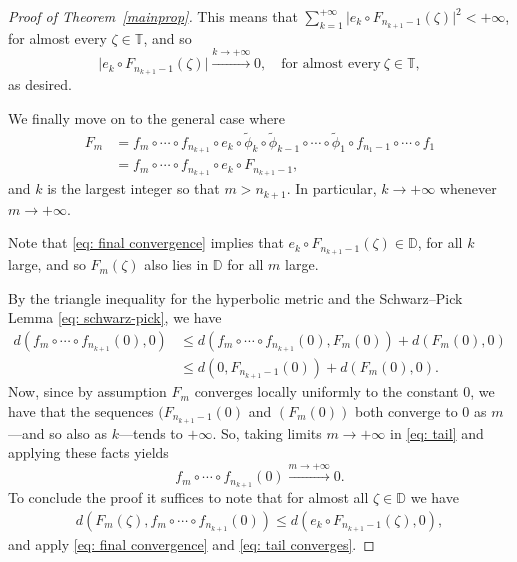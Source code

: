 \documentclass[11pt, reqno]{amsart}
\theoremstyle{definition}
\numberwithin{equation}{section}
\newcommand{\D}{\mathbb{D}}
\newcommand{\T}{\mathbb{T}}
\renewcommand{\leq}{\leqslant}
\begin{document}
\begin{proof}[Proof of Theorem~\ref{mainprop}]
This means that $\sum\limits_{k=1}^{+\infty} \lvert e_k\circ F_{n_{k+1}-1}(\zeta)\rvert^2<+\infty$, for almost every $\zeta\in\T$, and so 
\begin{equation}\label{eq: final convergence}
\lvert e_k\circ F_{n_{k+1}-1}(\zeta) \rvert\xrightarrow{k\to+\infty} 0, \quad \text{for almost every}\  \zeta\in\T,
\end{equation} 
as desired.

We finally move on to the general case where
\begin{align*}
F_m&= f_m\circ\cdots \circ f_{n_{k+1}}\circ e_k\circ \widetilde{\phi}_k\circ \widetilde{\phi}_{k-1}\circ \cdots\circ \widetilde{\phi}_1\circ f_{n_1-1}\circ\cdots \circ f_1\\
&=f_m\circ\cdots \circ f_{n_{k+1}}\circ e_k\circ F_{n_{k+1}-1},
\end{align*}
and $k$ is the largest integer so that $m>n_{k+1}$. In particular, $k\to+\infty$ whenever $m\to+\infty$.

Note that \eqref{eq: final convergence} implies that $e_k\circ F_{n_{k+1}-1}(\zeta)\in\D$, for all $k$ large, and so $F_m(\zeta)$ also lies in $\D$ for all $m$ large.

By the triangle inequality for the hyperbolic metric and the Schwarz--Pick Lemma \eqref{eq: schwarz-pick}, we have
\begin{align}
d(f_m\circ\cdots\circ f_{n_{k+1}}(0),0)&\leq d(f_m\circ\cdots\circ f_{n_{k+1}} (0),F_m(0))+ d(F_m(0),0)\nonumber\\
		&\leq d(0,F_{n_{k+1}-1}(0)) + d(F_m(0),0).\label{eq: tail}
\end{align}
Now, since by assumption $F_m$ converges locally uniformly to the constant 0, we have that the sequences $(F_{n_{k+1}-1}(0)$ and $(F_m(0))$ both converge to 0 as $m$---and so also as $k$---tends to $+\infty$. So, taking limits $m\to+\infty$ in \eqref{eq: tail} and applying these facts yields
\begin{equation}\label{eq: tail converges}
f_m\circ\cdots\circ f_{n_{k+1}}(0)\xrightarrow{m\to+\infty}0.
\end{equation}
To conclude the proof it suffices to note that for almost all $\zeta\in\D$ we have
\begin{align*}
d(F_m(\zeta),f_m\circ\cdots\circ f_{n_{k+1}}(0))\leq d(e_k\circ F_{n_{k+1}-1}(\zeta),0),
\end{align*}
and apply \eqref{eq: final convergence} and \eqref{eq: tail converges}.
\end{proof}
\end{document}
